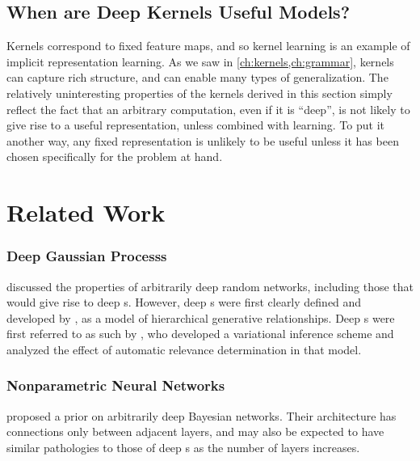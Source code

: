\subsection{When are Deep Kernels Useful Models?}

Kernels correspond to fixed feature maps, and so kernel learning is an example of implicit representation learning. %
As we saw in \cref{ch:kernels,ch:grammar}, kernels can capture rich structure,
 and can enable many types of generalization.
The relatively uninteresting properties of the kernels derived in this section simply reflect the fact that an arbitrary computation, even if it is ``deep'', is not likely to give rise to a useful representation, unless combined with learning.
To put it another way, any fixed representation is unlikely to be useful unless it has been chosen specifically for the problem at hand.






\section{Related Work}

\subsubsection{Deep Gaussian Processs}
\citet{neal1995bayesian} discussed the properties of arbitrarily deep random networks, including those that would give rise to deep \gp{}s.
However, deep \gp{}s were first clearly defined and developed by \cite{lawrence2007hierarchical}, as a model of hierarchical generative relationships.
Deep \gp{}s were first referred to as such by \citet{damianou2012deep}, who developed a variational inference scheme and analyzed the effect of automatic relevance determination in that model.

\subsubsection{Nonparametric Neural Networks}
\citet{adams2010learning} proposed a prior on arbitrarily deep Bayesian networks.
Their architecture has connections only between adjacent layers, and may also be expected to have similar pathologies to those of deep \gp{}s as the number of layers increases.

